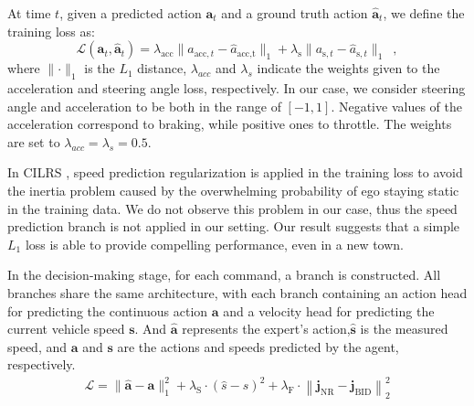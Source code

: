 At time $t$, given a predicted action $\mathbf{a}_{t}$ and a ground truth action $\hat{\mathbf{a}}_{t}$, we define the training loss as:
\begin{equation}\label{eq:loss}
	\mathcal{L}(\mathbf{a}_t, \hat{\mathbf{a}}_t) = \lambda_{\text{acc}}\lVert a_{\text{acc},t}-\hat{a}_{\text{acc,t}}\rVert_{1} + \lambda_{\text{s}} \lVert a_{\text{s},t}-\hat{a}_{\text{s},t} \rVert_{1} \enspace ,
\end{equation}
where $\lVert\cdot\rVert_{1}$ is the $L_1$ distance, $\lambda_{acc}$ and $\lambda_s$ indicate the weights given to the acceleration and steering angle loss, respectively. 
In our case, we consider steering angle and acceleration to be both in the range of $[-1, 1]$. 
Negative values of the acceleration correspond to braking, while positive ones to throttle.
The weights are set to $\lambda_{acc} = \lambda_{s} = 0.5$. 


In CILRS \cite{Codevilla:2019}, speed prediction regularization is applied in the training loss to avoid the inertia problem caused by the overwhelming probability of ego staying static in the training data. 
We do not observe this problem in our case, thus the speed prediction branch is not applied in our setting. 
Our result suggests that a simple $L_1$ loss is able to provide compelling performance, even in a new town.


%

In the decision-making stage, for each command, a branch is constructed. 
All branches share the same architecture, with each branch containing an action head for predicting the continuous action $\mathbf{a}$ and a velocity head for predicting the current vehicle speed $\mathbf{s}$. 
And $\mathbf{\hat{a}}$ represents the expert's action,$\mathbf{\hat{s}}$ is the measured speed, and $\mathbf{a}$ and $\mathbf{s}$ are the actions and speeds predicted by the agent, respectively. 
\begin{align}
   \mathcal{L} = \|\hat{\mathbf{a}}-\mathbf{a}\|_{1}^{2} + \lambda_{\mathrm{S}} \cdot (\hat{s}-s)^{2} + \lambda_{\mathrm{F}} \cdot \left\| \mathbf{j}_{\mathrm{NR}}-\mathbf{j}_{\mathrm{BID}} \right\|_{2}^{2}
\end{align}


